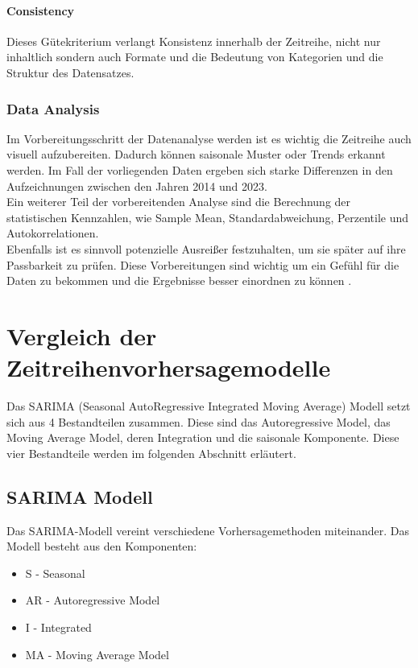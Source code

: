 \documentclass[12pt]{report}
\begin{document}
	\subsubsection{Consistency}
	Dieses Gütekriterium verlangt Konsistenz innerhalb der Zeitreihe, nicht nur inhaltlich sondern auch Formate und die Bedeutung von Kategorien und die Struktur des Datensatzes.
	
	\subsection{Data Analysis}
	Im Vorbereitungsschritt der Datenanalyse werden ist es wichtig die Zeitreihe auch visuell aufzubereiten. Dadurch können saisonale Muster oder Trends erkannt werden\cite[14f.]{Montgomery.2015}. 
	Im Fall der vorliegenden Daten ergeben  sich starke Differenzen in den Aufzeichnungen zwischen den Jahren 2014 und 2023.\\
	Ein weiterer Teil der vorbereitenden Analyse sind die Berechnung der statistischen Kennzahlen, wie Sample Mean, Standardabweichung, Perzentile und Autokorrelationen.\\ %
	Ebenfalls ist es sinnvoll potenzielle Ausreißer festzuhalten, um sie später auf ihre Passbarkeit zu prüfen. Diese Vorbereitungen sind wichtig um ein Gefühl für die Daten zu bekommen und die Ergebnisse besser einordnen zu können \cite[15]{Montgomery.2015}.\\
	
	\chapter{Vergleich der Zeitreihenvorhersagemodelle}
	Das SARIMA (Seasonal AutoRegressive Integrated Moving Average) Modell setzt sich aus 4 Bestandteilen zusammen. Diese sind das Autoregressive Model, das Moving Average Model, deren Integration und die saisonale Komponente. Diese vier Bestandteile werden im folgenden Abschnitt erläutert.
	\section{SARIMA Modell}
	Das SARIMA-Modell vereint verschiedene Vorhersagemethoden miteinander. Das Modell besteht aus den Komponenten:
	\begin{itemize}
		\item S - Seasonal
		\item AR - Autoregressive Model
		\item I - Integrated
		\item MA - Moving Average Model
	\end{itemize}
\end{document}
